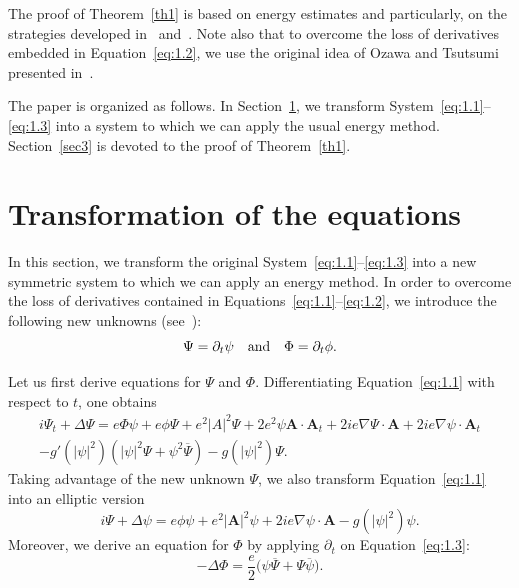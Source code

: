 \documentclass[10pt]{amsart}
\theoremstyle{definition}\newtheorem{defi}[theo]{Definition}\newtheorem{rema}[theo]{Remark}\newtheorem{exam}[theo]{Example}\newtheorem{exem}[theo]{Example}\newtheorem{nota}[theo]{Notation}
\newcommand{\BA}{\mathbf{A}}
\begin{document}
The proof of Theorem~\ref{th1} is based on energy estimates and particularly, on the strategies developed in~\cite{Co1} and~\cite{CC}. Note also that to overcome the loss of derivatives embedded in Equation~\eqref{eq:1.2}, we use the original idea of Ozawa and Tsutsumi presented in~\cite{OT}.

The paper is organized as follows. In Section~\ref{sec2}, we transform System~\eqref{eq:1.1}--\eqref{eq:1.3} into a system to which we can apply the usual energy method. Section~\ref{sec3} is devoted to the proof of Theorem~\ref{th1}.



\section{Transformation of the equations}\label{sec2}

In this section, we transform the original System~\eqref{eq:1.1}--\eqref{eq:1.3} into a new symmetric system to which we can apply an energy method. In order to overcome the loss of derivatives contained in Equations~\eqref{eq:1.1}--\eqref{eq:1.2}, we introduce the following new unknowns (see~\cite{OT}):
\[
\Psi=\partial_t \psi \quad \hbox{and} \quad \Phi=\partial_t \phi.
\]

Let us first derive equations for $\Psi$ and $\Phi$. Differentiating Equation~\eqref{eq:1.1} with respect to $t$, one obtains
\begin{multline*}
i\Psi_t +\Delta \Psi = e \Phi \psi +e \phi \Psi +e^2 |A|^2 \Psi+ 2e^2 \psi \BA \cdot \BA_t +2i e \nabla \Psi \cdot \BA +2i e \nabla \psi \cdot \BA_t \\
-g'(|\psi|^2)(|\psi|^2\Psi+\psi^2\overline{\Psi})-g(|\psi|^2)\Psi.
\end{multline*}
Taking advantage of the new unknown $\Psi$, we also transform Equation~\eqref{eq:1.1} into an elliptic version
\begin{equation*}
i\Psi +\Delta \psi = e\phi \psi +e^2 |\BA|^2 \psi + 2 ie \nabla \psi\cdot \BA -g(|\psi|^2)\psi.
\end{equation*}
Moreover, we derive an equation for $\Phi$ by applying $\partial_t$ on Equation~\eqref{eq:1.3}:
\begin{equation*}
-\Delta \Phi =\frac{e}{2} \big(\psi \overline{\Psi}+\Psi \overline{\psi}\big).
\end{equation*}
\end{document}
